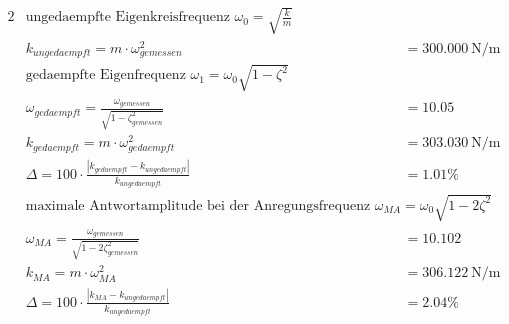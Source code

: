\begin{questions}
    \begin{solution}
        \begin{alignat*}{2}
            &\text{ungedaempfte Eigenkreisfrequenz  } \omega_0 = \sqrt{\frac{k}{m}} \\
            &k_{ungedaempft} = m \cdot \omega_{gemessen}^2 &&= \SI{300.000}{\newton \per \meter} \\
            &\text{gedaempfte Eigenfrequenz  } \omega_1 = \omega_0 \sqrt{1-\zeta^2} \\
            &\omega_{gedaempft} = \frac{\omega_{gemessen}}{\sqrt{1-\zeta_{gemessen}^2}} &&= 10.05\\
            &k_{gedaempft} = m \cdot \omega_{gedaempft}^2 &&= \SI{303.030}{\newton \per \meter}\\
            &\Delta = 100 \cdot \frac{|k_{gedaempft} - k_{ungedaempft}|}{k_{ungedaempft}} &&= 1.01 \%\\
            &\text{maximale Antwortamplitude bei der Anregungsfrequenz  } \omega_{MA} = \omega_0 \sqrt{1-2 \zeta^2} \\
            &\omega_{MA} = \frac{\omega_{gemessen}}{\sqrt{1-2\zeta_{gemessen}^2}} &&= 10.102\\
            &k_{MA} = m \cdot \omega_{MA}^2 &&= \SI{306.122}{\newton \per \meter}\\
            &\Delta = 100 \cdot \frac{|k_{MA} - k_{ungedaempft}|}{k_{ungedaempft}} &&= 2.04 \% \\ 
        \end{alignat*}
    \end{solution}

\end{questions}